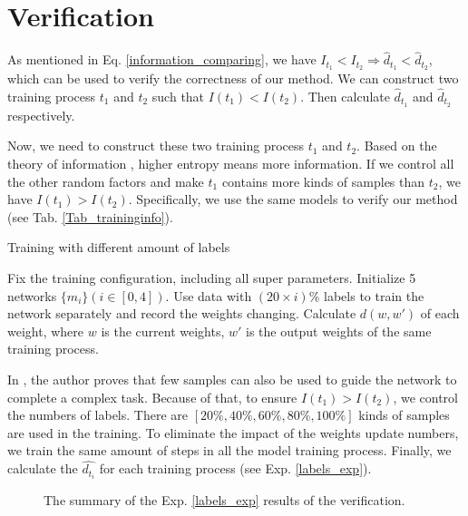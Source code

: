 \documentclass[letterpaper]{article} %
\begin{document}
\section{Verification}
As mentioned in Eq. \ref{information_comparing}, we have  $I_{t_1} < I_{t_2} \Rightarrow \hat{d}_{t_1} < \hat{d}_{t_2}$, which can be used to verify the correctness of our method. We can construct two training process $t_1$ and $t_2$ such that $I(t_1) < I(t_2)$. Then calculate  $\hat{d}_{t_1}$ and $\hat{d}_{t_2}$ respectively.

Now, we need to construct these two training process $t_1$ and $t_2$. Based on the theory of information \cite{shannon1948mathematical}, higher entropy means more information. If we control all the other random factors and make $t_1$ contains more kinds of samples than $t_2$, we have $I(t_1)>I(t_2)$. Specifically, we use the same models to verify our method (see Tab. \ref{Tab_traininginfo}).

\begin{algorithm}[ht]
\caption{Training with different amount of labels\label{labels_exp}}
\begin{algorithmic}[1]
    \STATE Fix the training configuration, including all super parameters.
    \STATE Initialize 5 networks $\{m_i\} (i \in [0,4])$.
    \STATE Use data with $(20\times i)\%$ labels to train the network separately and record the weights changing.
    \STATE Calculate $d(w,w')$ of each weight, where $w$ is the current weights, $w'$ is the output weights of the same training process.
\end{algorithmic}
\end{algorithm}

In \cite{wang2020generalizing}, the author proves that few samples can also be used to guide the network to complete a complex task. Because of that, to ensure  $I(t_1)>I(t_2)$, we control the numbers of labels. There are $[20\%,40\%,60\%,80\%,100\%]$ kinds of samples are used in the training. To eliminate the impact of the weights update numbers, we train the same amount of steps in all the model training process. Finally, we calculate the $\hat{d_{t_i}}$ for each training process (see Exp. \ref{labels_exp}).
\begin{figure*}[p]
    \centering
    \caption{The summary of the Exp. \ref{labels_exp} results of the verification.}
    \label{ed_1}
\end{figure*}
\end{document}
